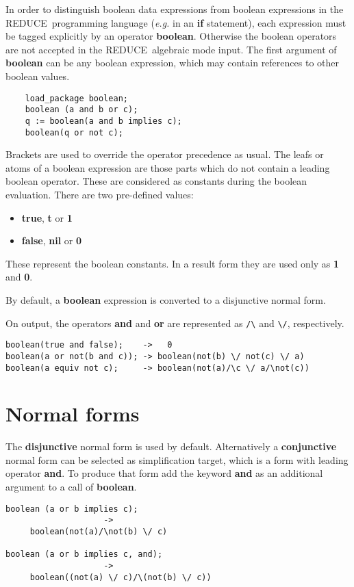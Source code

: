 \documentclass[11pt,letterpaper]{book}
\newcommand{\REDUCE}{REDUCE}
\begin{document}
In order to distinguish boolean data expressions from
boolean expressions in the \REDUCE\ programming
language ({\em e.g.} in an {\bf if} statement), each expression
must be tagged explicitly by an operator {\bf boolean}.
Otherwise the boolean operators are not accepted in the
\REDUCE\  algebraic mode input.
The first argument of {\bf boolean} can be any boolean expression,
which may contain references to other boolean values.
{\small\begin{verbatim}
    load_package boolean;
    boolean (a and b or c);
    q := boolean(a and b implies c);
    boolean(q or not c);
\end{verbatim}}
Brackets are used to override the operator precedence as usual.
The leafs or atoms of a boolean expression are those parts which
do not contain a leading boolean operator.  These are
considered as constants during the boolean evaluation.  There
are two pre-defined values:
\begin{itemize}
\item {\bf true}, {\bf t} or {\bf 1}
\item {\bf false}, {\bf nil} or {\bf 0}
\end{itemize}
These represent the boolean constants.  In a result
form they are used only as {\bf 1} and {\bf 0}.

By default, a {\bf boolean} expression is converted  to a
disjunctive normal form.

On output, the operators {\bf and} and {\bf or} are represented as
\verb+/\+ and \verb+\/+, respectively.
{\small\begin{verbatim}
boolean(true and false);    ->   0
boolean(a or not(b and c)); -> boolean(not(b) \/ not(c) \/ a)
boolean(a equiv not c);     -> boolean(not(a)/\c \/ a/\not(c))
\end{verbatim}}

\section{Normal forms}

The {\bf disjunctive} normal form is used by default.
Alternatively a {\bf conjunctive} normal form can be
selected as simplification target, which is a form with
leading operator {\bf and}.  To produce that form add the keyword {\bf and}
as an additional argument to a call of {\bf boolean}.
{\small\begin{verbatim}
boolean (a or b implies c);
                    ->
     boolean(not(a)/\not(b) \/ c)

boolean (a or b implies c, and);
                    ->
     boolean((not(a) \/ c)/\(not(b) \/ c))
\end{verbatim}}
\end{document}
